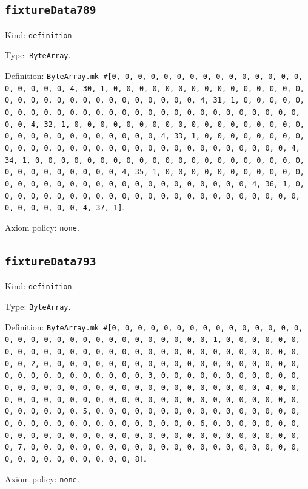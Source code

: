 \documentclass[11pt]{article}
\begin{document}
\subsection*{\texttt{fixtureData789}}
\noindent Kind: \texttt{definition}.\par
\noindent Type: \texttt{ByteArray}.\par
\noindent Definition: \texttt{ByteArray.mk \#[0, 0, 0, 0, 0, 0, 0, 0, 0, 0, 0, 0, 0, 0, 0, 0, 0, 0, 0, 0, 4, 30, 1, 0, 0, 0, 0, 0, 0, 0, 0, 0, 0, 0, 0, 0, 0, 0, 0, 0, 0, 0, 0, 0, 0, 0, 0, 0, 0, 0, 0, 0, 0, 4, 31, 1, 0, 0, 0, 0, 0, 0, 0, 0, 0, 0, 0, 0, 0, 0, 0, 0, 0, 0, 0, 0, 0, 0, 0, 0, 0, 0, 0, 0, 0, 0, 4, 32, 1, 0, 0, 0, 0, 0, 0, 0, 0, 0, 0, 0, 0, 0, 0, 0, 0, 0, 0, 0, 0, 0, 0, 0, 0, 0, 0, 0, 0, 0, 0, 4, 33, 1, 0, 0, 0, 0, 0, 0, 0, 0, 0, 0, 0, 0, 0, 0, 0, 0, 0, 0, 0, 0, 0, 0, 0, 0, 0, 0, 0, 0, 0, 0, 4, 34, 1, 0, 0, 0, 0, 0, 0, 0, 0, 0, 0, 0, 0, 0, 0, 0, 0, 0, 0, 0, 0, 0, 0, 0, 0, 0, 0, 0, 0, 0, 0, 4, 35, 1, 0, 0, 0, 0, 0, 0, 0, 0, 0, 0, 0, 0, 0, 0, 0, 0, 0, 0, 0, 0, 0, 0, 0, 0, 0, 0, 0, 0, 0, 0, 4, 36, 1, 0, 0, 0, 0, 0, 0, 0, 0, 0, 0, 0, 0, 0, 0, 0, 0, 0, 0, 0, 0, 0, 0, 0, 0, 0, 0, 0, 0, 0, 0, 4, 37, 1]}.\par
\noindent Axiom policy: \texttt{none}.\par
\subsection*{\texttt{fixtureData793}}
\noindent Kind: \texttt{definition}.\par
\noindent Type: \texttt{ByteArray}.\par
\noindent Definition: \texttt{ByteArray.mk \#[0, 0, 0, 0, 0, 0, 0, 0, 0, 0, 0, 0, 0, 0, 0, 0, 0, 0, 0, 0, 0, 0, 0, 0, 0, 0, 0, 0, 0, 0, 0, 1, 0, 0, 0, 0, 0, 0, 0, 0, 0, 0, 0, 0, 0, 0, 0, 0, 0, 0, 0, 0, 0, 0, 0, 0, 0, 0, 0, 0, 0, 0, 0, 2, 0, 0, 0, 0, 0, 0, 0, 0, 0, 0, 0, 0, 0, 0, 0, 0, 0, 0, 0, 0, 0, 0, 0, 0, 0, 0, 0, 0, 0, 0, 0, 3, 0, 0, 0, 0, 0, 0, 0, 0, 0, 0, 0, 0, 0, 0, 0, 0, 0, 0, 0, 0, 0, 0, 0, 0, 0, 0, 0, 0, 0, 0, 0, 4, 0, 0, 0, 0, 0, 0, 0, 0, 0, 0, 0, 0, 0, 0, 0, 0, 0, 0, 0, 0, 0, 0, 0, 0, 0, 0, 0, 0, 0, 0, 0, 5, 0, 0, 0, 0, 0, 0, 0, 0, 0, 0, 0, 0, 0, 0, 0, 0, 0, 0, 0, 0, 0, 0, 0, 0, 0, 0, 0, 0, 0, 0, 0, 6, 0, 0, 0, 0, 0, 0, 0, 0, 0, 0, 0, 0, 0, 0, 0, 0, 0, 0, 0, 0, 0, 0, 0, 0, 0, 0, 0, 0, 0, 0, 0, 7, 0, 0, 0, 0, 0, 0, 0, 0, 0, 0, 0, 0, 0, 0, 0, 0, 0, 0, 0, 0, 0, 0, 0, 0, 0, 0, 0, 0, 0, 0, 0, 8]}.\par
\noindent Axiom policy: \texttt{none}.\par
\end{document}
